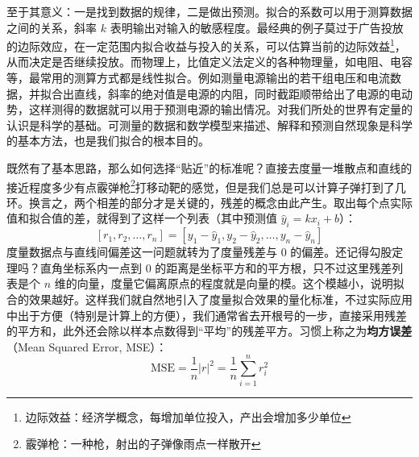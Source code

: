 \documentclass[UTF8, 12pt]{article}
\begin{document}
至于其意义：一是找到数据的规律，二是做出预测。拟合的系数可以用于测算数据之间的关系，斜率 $k$ 表明输出对输入的敏感程度。最经典的例子莫过于广告投放的边际效应，在一定范围内拟合收益与投入的关系，可以估算当前的边际效益\footnote{边际效益：经济学概念，每增加单位投入，产出会增加多少单位}，从而决定是否继续投放。而物理上，比值定义法定义的各种物理量，如电阻、电容等，最常用的测算方式都是线性拟合。例如测量电源输出的若干组电压和电流数据，并拟合出直线，斜率的绝对值是电源的内阻，同时截距顺带给出了电源的电动势，这样测得的数据就可以用于预测电源的输出情况。对我们所处的世界有定量的认识是科学的基础。可测量的数据和数学模型来描述、解释和预测自然现象是科学的基本方法，也是我们拟合的根本目的。

既然有了基本思路，那么如何选择“贴近”的标准呢？直接去度量一堆散点和直线的接近程度多少有点霰弹枪\footnote{霰弹枪：一种枪，射出的子弹像雨点一样散开}打移动靶的感觉，但是我们总是可以计算子弹打到了几环。换言之，两个相差的部分才是关键的，残差的概念由此产生。取出每个点实际值和拟合值的差，就得到了这样一个列表（其中预测值 $\hat y_i = kx_i + b$）：
\[
    [r_1, r_2, \ldots, r_n] = [y_1 - \hat y_1, y_2 - \hat y_2, \ldots, y_n - \hat y_n]
\]
度量数据点与直线间偏差这一问题就转为了度量残差与 0 的偏差。还记得勾股定理吗？直角坐标系内一点到 0 的距离是坐标平方和的平方根，只不过这里残差列表是个 $n$ 维的向量，度量它偏离原点的程度就是向量的模。这个模越小，说明拟合的效果越好。这样我们就自然地引入了度量拟合效果的量化标准，不过实际应用中出于方便（特别是计算上的方便），我们通常省去开根号的一步，直接采用残差的平方和，此外还会除以样本点数得到“平均”的残差平方。习惯上称之为\textbf{均方误差}（Mean Squared Error, MSE）：
\[
    \text{MSE} = \frac1n |r|^2 = \frac1n \sum_{i=1}^n r_i^2
\]
\end{document}
